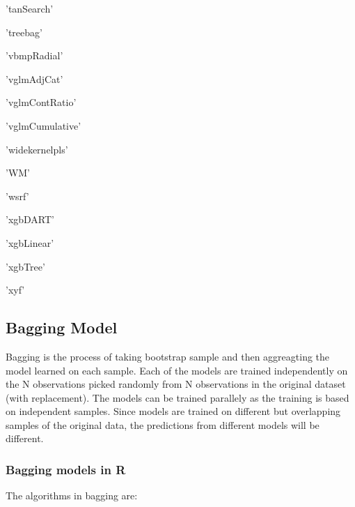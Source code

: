 \documentclass[11pt]{article}
\begin{document}
\begin{enumerate*}
\item 'tanSearch'
\item 'treebag'
\item 'vbmpRadial'
\item 'vglmAdjCat'
\item 'vglmContRatio'
\item 'vglmCumulative'
\item 'widekernelpls'
\item 'WM'
\item 'wsrf'
\item 'xgbDART'
\item 'xgbLinear'
\item 'xgbTree'
\item 'xyf'
\end{enumerate*}


    
    \hypertarget{bagging-model}{%
\subsection{Bagging Model}\label{bagging-model}}

Bagging is the process of taking bootstrap sample and then aggreagting
the model learned on each sample. Each of the models are trained
independently on the N observations picked randomly from N observations
in the original dataset (with replacement). The models can be trained
parallely as the training is based on independent samples. Since models
are trained on different but overlapping samples of the original data,
the predictions from different models will be different.

\hypertarget{bagging-models-in-r}{%
\subsubsection{Bagging models in R}\label{bagging-models-in-r}}

The algorithms in bagging are:
\end{document}
